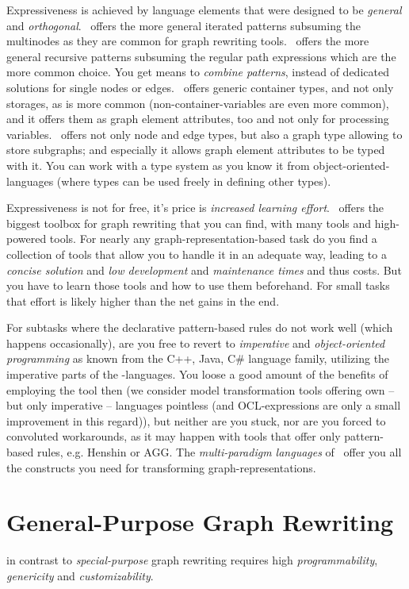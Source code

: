 Expressiveness is achieved by language elements that were designed to be \emph{general} and \emph{orthogonal}.
\GrG\ offers the more general iterated patterns subsuming the multinodes as they are common for graph rewriting tools.
\GrG\ offers the more general recursive patterns subsuming the regular path expressions which are the more common choice.
You get means to \emph{combine patterns}, instead of dedicated solutions for single nodes or edges.
\GrG\ offers generic container types, and not only storages, as is more common (non-container-variables are even more common), and it offers them as graph element attributes, too and not only for processing variables.
\GrG\ offers not only node and edge types, but also a graph type allowing to store subgraphs; and especially it allows graph element attributes to be typed with it.
You can work with a type system as you know it from object-oriented-languages (where types can be used freely in defining other types).

Expressiveness is not for free, it's price is \emph{increased learning effort}.
\GrG\ offers the biggest toolbox for graph rewriting that you can find, with many tools and high-powered tools.
For nearly any graph-representation-based task do you find a collection of tools that allow you to handle it in an adequate way, leading to a \emph{concise solution} and \emph{low development} and \emph{maintenance times} and thus costs.
But you have to learn those tools and how to use them beforehand.
For small tasks that effort is likely higher than the net gains in the end.

For subtasks where the declarative pattern-based rules do not work well (which happens occasionally), are you free to revert to \emph{imperative} and \emph{object-oriented programming} as known from the C++, Java, C\# language family, utilizing the imperative parts of the \GrG-languages.
You loose a good amount of the benefits of employing the tool then (we consider model transformation tools offering own -- but only imperative -- languages pointless (and OCL-expressions are only a small improvement in this regard)), but neither are you stuck, nor are you forced to convoluted workarounds, as it may happen with tools that offer only pattern-based rules, e.g. Henshin\cite{Henshin} or AGG\cite{agg}.
The \emph{multi-paradigm languages} of \GrG\ offer you all the constructs you need for transforming graph-representations.

\section{General-Purpose Graph Rewriting}
in contrast to \emph{special-purpose} graph rewriting requires high \emph{programmability}, \emph{genericity} and \emph{customizability}.

